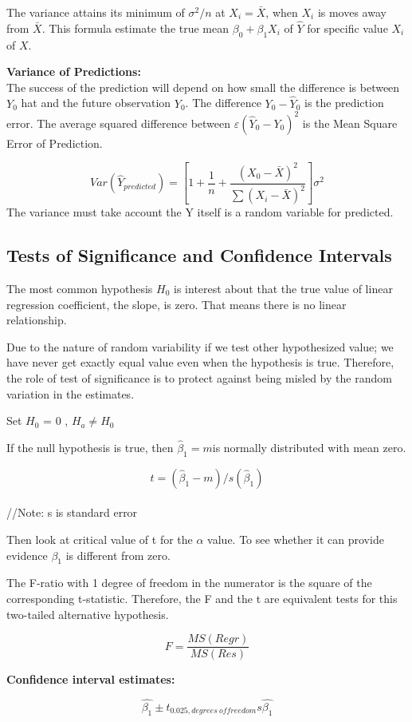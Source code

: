 \documentclass[12pt]{article}
\begin{document}
The variance attains its minimum of $\sigma^2/n$ at $X_i = \bar{X}$, when $X_i$ is moves away from $\bar{X}$.
This formula estimate the true mean $\beta_0 + \beta_1X_i$ of $\hat{Y}$ for specific value $X_i$ of $X$.

\textbf{Variance of Predictions:}
\\
The success of the prediction will depend on how small the difference is between $Y_0$ hat and the
future observation $Y_0$. The difference $Y_0 - \hat{Y}_0$ is the prediction error.
The average squared difference between $\varepsilon(\hat{Y}_0 - Y_0)^2$ is the Mean Square Error of Prediction.

$$Var(\hat{Y}_{predicted}) = \left[1 + \frac{1}{n} + \frac{(X_0 - \bar{X})^2}{\sum(X_i - \bar{X})^2}\right]\sigma^2$$
The variance must take account the Y itself is a random variable for predicted.

\subsection{Tests of Significance and Confidence Intervals}
The most common hypothesis $H_0$ is interest about that the true value of linear regression coefficient,
the slope, is zero. That means there is no linear relationship.

Due to the nature of random variability if we test other hypothesized value; we have never get exactly
equal value even when the hypothesis is true. Therefore, the role of test of significance is to protect
against being misled by the random variation in the estimates.

Set $H_0$ = 0 , $H_a \neq H_0$

If the null hypothesis is true, then $\hat{\beta}_1  = m $is normally distributed with mean zero.

$$t = (\hat{\beta}_1 - m)/ s(\hat{\beta}_1)$$      \\  //Note: s is standard error

Then look at critical value of t for the $\alpha$ value. 
To see whether it can provide evidence $\beta_1$ is different from zero.

The F-ratio with 1 degree of freedom in the numerator is the square of the corresponding t-statistic. Therefore, the F and the t are equivalent tests for this two-tailed
alternative hypothesis.

$$F = \frac{MS(Regr)}{MS(Res)}$$

\textbf{Confidence interval estimates:}

$$\hat{\beta_1} \pm t_{0.025, degrees\ of freedom}s\hat{\beta_1}$$
\end{document}
